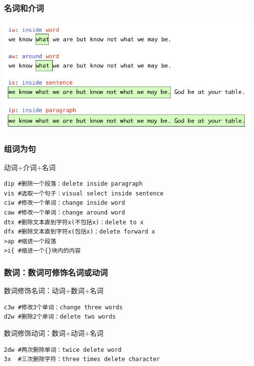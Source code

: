 \documentclass[xcolor=svgnames,presentation]{beamer}
\begin{document}
\begin{frame}
\frametitle{名词和介词}
\label{sec-4-4-3}

\includegraphics[width=.9\linewidth]{img/vimlang1.png}
\end{frame}
\begin{frame}[fragile]
\frametitle{组词为句}
\label{sec-4-4-4}
\begin{exampleblock}{动词+介词+名词}
\label{sec-4-4-4-1}


\begin{verbatim}
dip #删除一个段落：delete inside paragraph
vis #选取一个句子：visual select inside sentence
ciw #修改一个单词：change inside word
caw #修改一个单词：change around word
dtx #删除文本直到字符x(不包括x)：delete to x
dfx #删除文本直到字符x(包括x)：delete forward x
>ap #缩进一个段落
>i{ #缩进一个{}块内的内容
\end{verbatim}
\end{exampleblock}
\end{frame}
\begin{frame}[fragile]
\frametitle{数词：数词可修饰名词或动词}
\label{sec-4-4-5}
\begin{exampleblock}{数词修饰名词：动词+数词+名词}
\label{sec-4-4-5-1}


\begin{verbatim}
c3w #修改3个单词：change three words
d2w #删除2个单词：delete two words
\end{verbatim}
\end{exampleblock}
\begin{block}{数词修饰动词：数词+动词+名词}
\label{sec-4-4-5-2}


\begin{verbatim}
2dw #两次删除单词：twice delete word
3x  #三次删除字符：three times delete character
\end{verbatim}
\end{block}
\end{frame}
\end{document}

